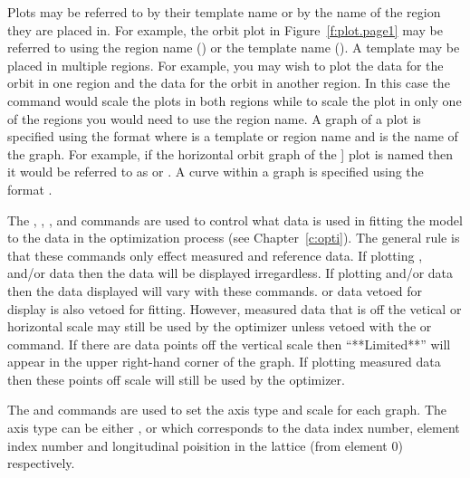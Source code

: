 Plots may be referred to by their template name or by the name of the
region they are placed in. For example, the orbit plot in
Figure~\ref{f:plot.page1} may be referred to using the region name
() or the template name (). A template may be placed
in multiple regions.  For example, you may wish to plot the 
data for the orbit in one region and the  data for the
orbit in another region. In this case the command 
would scale the plots in both regions while to scale the plot in only
one of the regions you would need to use the region name. A graph of a
plot is specified using the format  where
 is a template or region name and  is the
name of the graph. For example, if the horizontal orbit graph of the
] plot is named  then it would be referred to as
 or . A curve within a graph is specified using
the format .

The , , , and  commands are used
to control what data is used in fitting the model to the data in the
optimization process (see Chapter~\ref{c:opti}). The general rule is
that these commands only effect measured and reference data. If
plotting ,  and/or  data then the data
will be displayed irregardless. If plotting  and/or  data
then the data displayed will vary with these commands.   or
 data vetoed for display is also vetoed for fitting.  However,
measured data that is off the vetical or horizontal scale may still be
used by the optimizer unless vetoed with the  or 
command.  If there are data points off the vertical scale then
``**Limited**'' will appear in the upper right-hand corner of the
graph. If plotting measured data then these points off scale will
still be used by the optimizer.

The  and  commands are used to set the axis
type and scale for each graph. The axis type can be either ,
 or  which corresponds to the data index number,
element index number and longitudinal poisition in the lattice (from
element 0) respectively.

